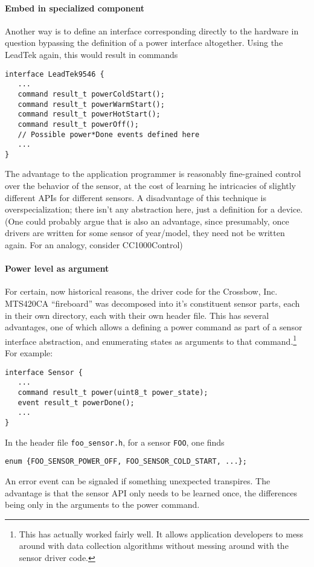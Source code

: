 \documentclass[10pt]{article}
\begin{document}
\paragraph{Embed in specialized component}
Another way is to define an interface corresponding
directly to the hardware in question bypassing 
the definition of a power interface altogether.  
Using the LeadTek again, this would result in commands
\begin{verbatim}
interface LeadTek9546 {
   ...
   command result_t powerColdStart();
   command result_t powerWarmStart();
   command result_t powerHotStart();
   command result_t powerOff();
   // Possible power*Done events defined here
   ...
}
\end{verbatim}
The advantage to the application programmer is 
reasonably fine-grained control over the behavior
of the sensor, at the cost of learning 
he intricacies of slightly different APIs for  different 
sensors.  A disadvantage of this technique is 
overspecialization; there isn't any abstraction 
here, just a definition for a device.  (One 
could probably argue that is also an advantage,
since presumably, once drivers are written for 
some sensor of year/model, they need not 
be written again. For an analogy, consider 
CC1000Control)


\paragraph{Power level as argument}
For certain, now historical reasons, the driver code
for the Crossbow, Inc. MTS420CA ``fireboard'' was
decomposed into it's constituent sensor parts,
each in their own directory, each with their 
own header file.  This has several advantages,
one of which allows a defining a power command
as part of a sensor interface abstraction, and 
enumerating states as arguments to that 
command.\footnote{This has actually worked fairly
well.  It allows application developers to mess 
around with data collection algorithms without 
messing around with the sensor driver code.}
For example:
\begin{verbatim}
interface Sensor {
   ...
   command result_t power(uint8_t power_state);
   event result_t powerDone();
   ...
}
\end{verbatim}
In the header file {\tt foo\_sensor.h}, 
for a sensor {\tt FOO}, one finds
\begin{verbatim}
enum {FOO_SENSOR_POWER_OFF, FOO_SENSOR_COLD_START, ...};
\end{verbatim}
An error event can be signaled if something 
unexpected transpires.  The advantage is that the 
sensor API only needs to be learned once, the 
differences being only in the arguments to the 
power command.
\end{document}
